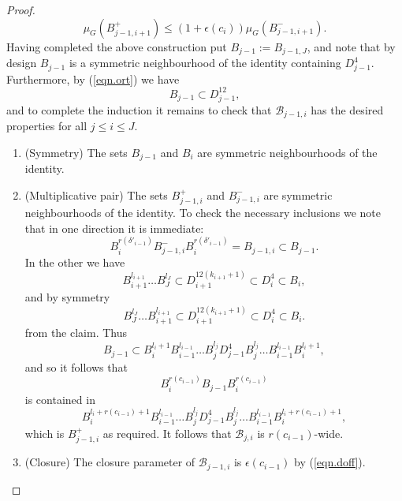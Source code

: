 \documentclass[12pt]{amsart}
\numberwithin{equation}{section}
\theoremstyle{plain}
\theoremstyle{definition}
\renewcommand{\leq}{\leqslant}
\begin{document}
\begin{proof}
\begin{equation}\label{eqn.doff}
\mu_G(B_{j-1,i+1}^+) \leq (1+\epsilon(c_i))\mu_G(B_{j-1,i+1}^-).
\end{equation}
Having completed the above construction put $B_{j-1}:=B_{j-1,J}$, and note that by design $B_{j-1}$ is a symmetric neighbourhood of the identity containing $D_{j-1}^4$. Furthermore, by (\ref{eqn.ort}) we have
\begin{equation*}
 B_{j-1} \subset D_{j-1}^{12},
\end{equation*}
and to complete the induction it remains to check that $\mathcal{B}_{j-1,i}$ has the desired properties for all $j \leq i \leq J$.
\begin{enumerate}
\item (Symmetry) The sets $B_{j-1}$ and $B_i$ are symmetric neighbourhoods of the identity.
\item (Multiplicative pair) The sets $B_{j-1,i}^+$ and $B_{j-1,i}^-$ are symmetric neighbourhoods of the identity.  To check the necessary inclusions we note that in one direction it is immediate:
\begin{equation*}
 B_{i}^{r(\delta'_{i-1})}B_{j-1,i}^-B_{i}^{r(\delta'_{i-1})} =B_{j-1,i} \subset B_{j-1}.
\end{equation*}
In the other we have
\begin{equation*}
B_{i+1}^{l_{i+1}} \dots B_{J}^{l_{J}} \subset D_{i+1}^{12(k_{i+1}+1)} \subset D_{i}^4 \subset B_i,
\end{equation*}
and by symmetry
\begin{equation*}
B_{J}^{l_{J}}\dots B_{i+1}^{l_{i+1}} \subset D_{i+1}^{12(k_{i+1}+1)} \subset D_{i}^4 \subset B_i.
\end{equation*}
from the claim. Thus
\begin{equation*}
B_{j-1} \subset B_i^{l_i+1}B_{i-1}^{l_{i-1}} \dots B_j^{l_j}D_{j-1}^4 B_j^{l_j}\dots B_{i-1}^{l_{i-1}} B_i^{l_i+1},
\end{equation*}
and so it follows that
\begin{equation*}
B_{i}^{r(c_{i-1})}B_{j-1}B_{i}^{r(c_{i-1})} 
\end{equation*}
is contained in
\begin{equation*}
B_{i}^{l_{i}+r(c_{i-1})+1}B_{i-1}^{l_{i-1}}\dots B_{j}^{l_j}D_{j-1}^4B_{j}^{l_j}\dots B_{i-1}^{l_{i-1}} B_{i}^{l_{i}+r(c_{i-1})+1},
\end{equation*}
which is $B_{j-1,i}^+$ as required.  It follows that $\mathcal{B}_{j,i}$ is $r(c_{i-1})$-wide.
\item (Closure) The closure parameter of $\mathcal{B}_{j-1,i}$ is $\epsilon(c_{i-1})$ by (\ref{eqn.doff}).

\end{enumerate}
\end{proof}
\end{document}
